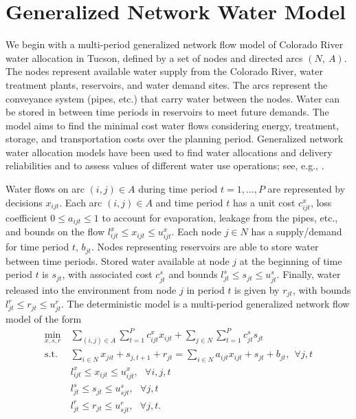 \documentclass[11pt]{article}
\newcommand{\st}{\mbox{s.t.}}
\begin{document}
\section{Generalized Network Water Model} 
\label{sec:network_model}

We begin with a multi-period generalized network flow model of Colorado River water allocation in Tucson, defined by a set of nodes and directed arcs $(N,\: A)$.
The nodes represent available water supply from the Colorado River, water treatment plants, reservoirs, and water demand sites.
The arcs represent the conveyance system (pipes, etc.) that carry water between the nodes. 
Water can be stored in between time periods in reservoirs to meet future demands. 
The model aims to find the minimal cost water flows considering energy, treatment, storage, and transportation costs over the planning period. 
Generalized network water allocation models have been used to find water allocations and delivery reliabilities and to assess values of different water use operations; see, e.g., \cite{draper_etal_03}. 

Water flows on arc $(i,j) \in A$ during time period $t = 1, \dots, P$ are represented by decisions $x_{ijt}$.
Each arc $(i,j) \in A$ and time period $t$ has a unit cost $c_{ijt}^x$, loss coefficient $0 \leq a_{ijt} \leq 1$ to account for evaporation, leakage from the pipes, etc., and bounds on the flow $l_{ijt}^x \leq x_{ijt} \leq u_{ijt}^x$.
Each node $j \in N$ has a supply/demand for time period $t$, $b_{jt}$.
Nodes representing reservoirs are able to store water between time periods.
Stored water available at node $j$ at the beginning of time period $t$ is $s_{jt}$, with associated cost $c_{jt}^s$ and bounds $l_{jt}^s \leq s_{jt} \leq u_{jt}^s$.
Finally, water released into the environment from node $j$ in period $t$ is given by $r_{jt}$, with bounds $l_{jt}^r \leq r_{jt} \leq u_{jt}^r$.
The deterministic model is a multi-period generalized network flow model of the form
\begin{align*}
	\min_{x,s,r} \ & \sum_{(i,j) \in A} \sum_{t=1}^P c_{ijt}^x x_{ijt} + \sum_{j \in N} \sum_{t=1}^P c_{jt}^s s_{jt}\\
	\st \ & \sum_{i \in N} x_{jit} + s_{j,t+1} + r_{jt} = \sum_{i \in N} a_{ijt} x_{ijt} + s_{jt} + b_{jt}, \ \ \forall j,t \\
	& l_{ijt}^x \leq x_{ijt} \leq u_{ijt}^x,\ \ \ \forall i,j,t \\
	& l_{jt}^s \leq s_{jt} \leq u_{sjt}^s, \ \ \ \forall j,t \\
	& l_{jt}^r \leq r_{jt} \leq u_{sjt}^r, \ \ \ \forall j,t.
\end{align*}
\end{document}
